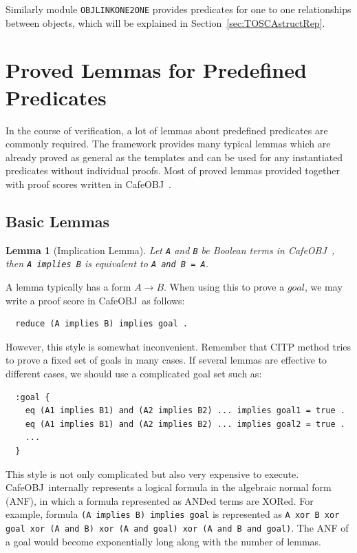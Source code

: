 \documentclass[12pt]{report}
\newtheorem{lemma}{Lemma}
\newcommand{\ra}{\rightarrow}
\newcommand{\stt}[1]{{\small{\tt {#1}}}}
\newcommand{\cafeobj}{{\sf CafeOBJ}~}
\begin{document}
Similarly module {\tt OBJLINKONE2ONE} provides predicates for one to
one relationships between objects, which will be explained in
Section~\ref{sec:TOSCAstructRep}.

\section{Proved Lemmas for Predefined Predicates}
\label{sec:lemma}
In the course of verification, a lot of lemmas about predefined
predicates are commonly required.  The framework provides many 
typical lemmas which are already proved as general as the templates
and can be used for any instantiated predicates without individual
proofs. Most of proved lemmas provided together with proof scores
written in \cafeobj.
\subsection{Basic Lemmas}
\label{sec:baselemma}
\begin{lemma}[Implication Lemma]
  Let {\tt A} and {\tt B} be Boolean terms in \cafeobj, then \stt{A
    implies B} is equivalent to \stt{A and B = A}.
\end{lemma}
A lemma typically has a form $A \ra B$. When using this to prove
a $goal$, we may write a proof score in \cafeobj as follows:
\small
\begin{verbatim}
  reduce (A implies B) implies goal .
\end{verbatim}
\normalsize
However, this style is somewhat inconvenient. Remember that CITP
method tries to prove a fixed set of goals in many cases. If several lemmas are
effective to different cases, we should use a complicated goal set such as:
\small
\begin{verbatim}
  :goal {
    eq (A1 implies B1) and (A2 implies B2) ... implies goal1 = true .
    eq (A1 implies B1) and (A2 implies B2) ... implies goal2 = true .
    ...
  }
\end{verbatim}
\normalsize
This style is not only complicated but also very expensive to execute.
\cafeobj internally represents a logical formula in the algebraic
normal form (ANF), in which a formula represented as ANDed terms are
XORed. For example, formula \stt{(A implies B) implies goal} is
represented as \stt{A xor B xor goal xor (A and B) xor (A and goal)
  xor (A and B and goal)}. The ANF of a goal would become
exponentially long along with the number of lemmas.
\end{document}
